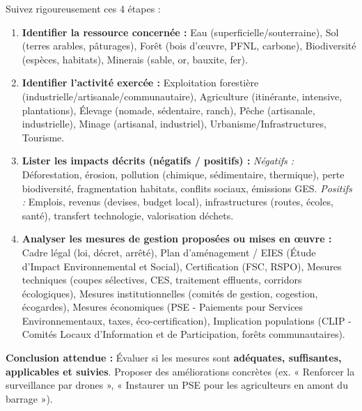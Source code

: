 \documentclass[11pt]{article}
\newcommand{\cle}[1]{{\popxbold\color{popdark}#1}}
\begin{document}
\begin{methode}
Suivez rigoureusement ces 4 étapes :
\begin{enumerate}
    \item \textbf{Identifier la ressource concernée :} Eau (superficielle/souterraine), Sol (terres arables, pâturages), Forêt (bois d'œuvre, PFNL, carbone), Biodiversité (espèces, habitats), Minerais (sable, or, bauxite, fer).
    \item \textbf{Identifier l'activité exercée :} Exploitation forestière (industrielle/artisanale/communautaire), Agriculture (itinérante, intensive, plantations), Élevage (nomade, sédentaire, ranch), Pêche (artisanale, industrielle), Minage (artisanal, industriel), Urbanisme/Infrastructures, Tourisme.
    \item \textbf{Lister les impacts décrits (négatifs / positifs) :} \textit{Négatifs :} Déforestation, érosion, pollution (chimique, sédimentaire, thermique), perte biodiversité, fragmentation habitats, conflits sociaux, émissions GES. \textit{Positifs :} Emplois, revenus (devises, budget local), infrastructures (routes, écoles, santé), transfert technologie, valorisation déchets.
    \item \textbf{Analyser les mesures de gestion proposées ou mises en œuvre :} Cadre légal (loi, décret, arrêté), Plan d'aménagement / \cle{EIES} (Étude d'Impact Environnemental et Social), Certification (FSC, RSPO), Mesures techniques (coupes sélectives, CES, traitement effluents, corridors écologiques), Mesures institutionnelles (comités de gestion, cogestion, écogardes), Mesures économiques (\cle{PSE} - Paiements pour Services Environnementaux, taxes, éco-certification), Implication populations (CLIP - Comités Locaux d'Information et de Participation, forêts communautaires).
\end{enumerate}
\textbf{Conclusion attendue :} Évaluer si les mesures sont \textbf{adéquates, suffisantes, applicables et suivies}. Proposer des améliorations concrètes (ex. « Renforcer la surveillance par drones », « Instaurer un PSE pour les agriculteurs en amont du barrage »).
\end{methode}
\end{document}
